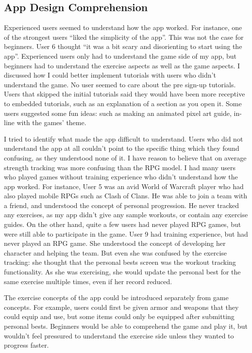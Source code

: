 \documentclass{l4proj}
\begin{document}
\subsection{App Design Comprehension}
Experienced users seemed to understand how the app worked. For instance, one of the strongest users ``liked the simplicity of the app''. This was not the case for beginners. User 6 thought ``it was a bit scary and disorienting to start using the app''. Experienced users only had to understand the game side of my app, but beginners had to understand the exercise aspects as well as the game aspects. I discussed how I could better implement tutorials with users who didn't understand the game. No user seemed to care about the pre sign-up tutorials. Users that skipped the initial tutorials said they would have been more receptive to embedded tutorials, such as an explanation of a section as you open it. Some users suggested some fun ideas: such as making an animated pixel art guide, in-line with the games' theme.

I tried to identify what made the app difficult to understand. Users who did not understand the app at all couldn't point to the specific thing which they found confusing, as they understood none of it. I have reason to believe that on average strength tracking was more confusing than the RPG model. I had many users who played games without training experience who didn't understand how the app worked. For instance, User 5 was an avid World of Warcraft player who had also played mobile RPGs such as Clash of Clans. He was able to join a team with a friend, and understood the concept of personal progression. He never tracked any exercises, as my app didn't give any sample workouts, or contain any exercise guides. On the other hand, quite a few users had never played RPG games, but were still able to participate in the game. User 9 had training experience, but had never played an RPG game. She understood the concept of developing her character and helping the team. But even she was confused by the exercise tracking: she thought that the personal bests screen was the workout tracking functionality. As she was exercising, she would update the personal best for the same exercise multiple times, even if her record reduced. 

The exercise concepts of the app could be introduced separately from game concepts. For example, users could first be given armor and weapons that they could equip and use, but some items could only be equipped after submitting personal bests. Beginners would be able to comprehend the game and play it, but wouldn't feel pressured to understand the exercise side unless they wanted to progress faster. 
\end{document}
